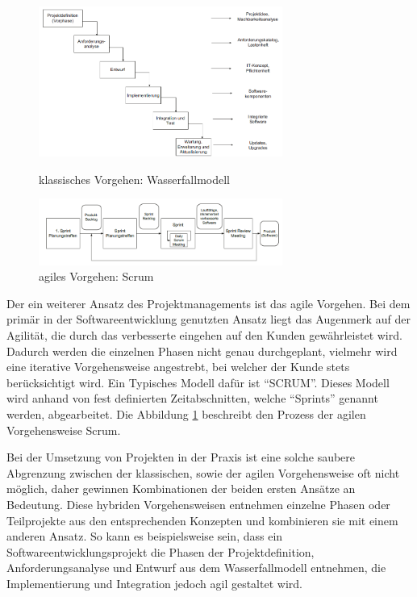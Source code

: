 	\begin{figure}
		\begin{minipage}[b]{.4\linewidth} %
			\includegraphics[width=8cm]{img/wasserfallmodell.png}
			\caption{klassisches Vorgehen: Wasserfallmodell \autocite[353]{Alpar2019}}
			\label{img:wasserfall}
		\end{minipage}
		\hspace{.1\linewidth}%
		\begin{minipage}[b]{.4\linewidth} %
			\includegraphics[width=8cm]{img/scrum.png}
			\caption{agiles Vorgehen: Scrum \autocite[372]{Alpar2019}}
			\label{img:scrum}
		\end{minipage}
	\end{figure}
	
	Der ein weiterer Ansatz des Projektmanagements ist das agile Vorgehen. Bei dem primär in der Softwareentwicklung genutzten Ansatz liegt das Augenmerk auf der Agilität, die durch das verbesserte eingehen auf den Kunden gewährleistet wird. Dadurch werden die einzelnen Phasen nicht genau durchgeplant, vielmehr wird eine iterative Vorgehensweise angestrebt, bei welcher der Kunde stets berücksichtigt wird. Ein Typisches Modell dafür ist \enquote{SCRUM}. Dieses Modell wird anhand von fest definierten Zeitabschnitten, welche \enquote{Sprints} genannt werden, abgearbeitet.\autocite[57-70]{Känel_2020_Projektphasen}\autocite[Kap. 1.3]{Alam2020}
	Die Abbildung \ref{img:scrum} beschreibt den Prozess der agilen Vorgehensweise Scrum.
	
	Bei der Umsetzung von Projekten in der Praxis ist eine solche saubere Abgrenzung zwischen der klassischen, sowie der agilen Vorgehensweise oft nicht möglich, daher gewinnen Kombinationen der beiden ersten Ansätze an Bedeutung. Diese hybriden Vorgehensweisen entnehmen einzelne Phasen oder Teilprojekte aus den entsprechenden Konzepten und kombinieren sie mit einem anderen  Ansatz. 
	So kann es beispielsweise sein, dass ein Softwareentwicklungsprojekt die Phasen der Projektdefinition, Anforderungsanalyse und Entwurf aus dem Wasserfallmodell entnehmen, die Implementierung und Integration jedoch agil gestaltet wird.\autocite[65]{Känel_2020_Projektphasen}
	
